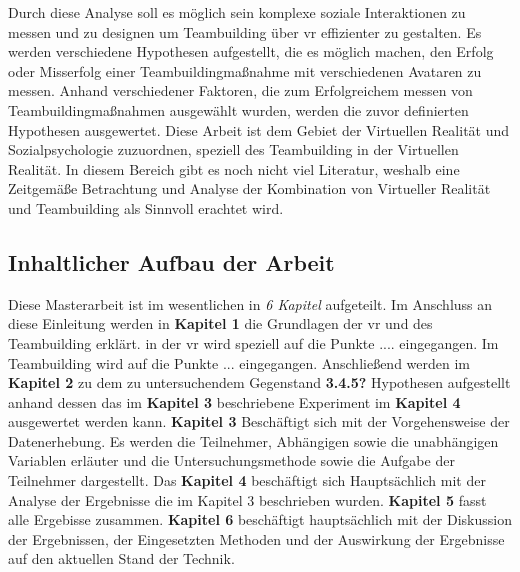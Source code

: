 \documentclass[a4paper,11pt]{article}%
\renewcommand{\\}{\vspace*{0.5\baselineskip} \newline}
\begin{document}
{	Durch diese Analyse soll es möglich sein komplexe soziale Interaktionen zu messen und zu designen um Teambuilding über \ac{vr} effizienter zu gestalten.\\
	Es werden verschiedene Hypothesen aufgestellt, die es möglich machen, den Erfolg oder Misserfolg einer Teambuildingmaßnahme mit verschiedenen Avataren zu messen.\\
	Anhand verschiedener Faktoren, die zum Erfolgreichem messen von Teambuildingmaßnahmen ausgewählt wurden, werden die zuvor definierten Hypothesen ausgewertet.\\
	Diese Arbeit ist dem Gebiet der Virtuellen Realität und Sozialpsychologie zuzuordnen, speziell des Teambuilding in der Virtuellen Realität.
	In diesem Bereich gibt es noch nicht viel Literatur, weshalb eine Zeitgemäße Betrachtung und Analyse der Kombination von Virtueller Realität und Teambuilding als Sinnvoll erachtet wird.\\



		\subsection{Inhaltlicher Aufbau der Arbeit}
	Diese Masterarbeit ist im wesentlichen in \textit{6 Kapitel} aufgeteilt.
	Im Anschluss an diese Einleitung werden in \textbf{Kapitel 1} die Grundlagen der \ac{vr} und des Teambuilding erklärt. in der \ac{vr} wird speziell auf die Punkte .... eingegangen.\\
	Im Teambuilding wird auf die Punkte ... eingegangen.\\
	Anschließend werden im \textbf{Kapitel 2} zu dem zu untersuchendem Gegenstand \textbf{3.4.5?} Hypothesen aufgestellt anhand dessen das im \textbf{Kapitel 3} beschriebene Experiment im \textbf{Kapitel 4} ausgewertet werden kann.\\
	\textbf{Kapitel 3} Beschäftigt sich mit der Vorgehensweise der Datenerhebung.
	Es werden die Teilnehmer, Abhängigen sowie die unabhängigen Variablen erläuter und die Untersuchungsmethode sowie die Aufgabe der Teilnehmer dargestellt.\\
	Das \textbf{Kapitel 4} beschäftigt sich Hauptsächlich mit der Analyse der Ergebnisse die im Kapitel 3 beschrieben wurden.\\
	\textbf{Kapitel 5} fasst alle Ergebisse zusammen.\\
	\textbf{Kapitel 6} beschäftigt hauptsächlich mit der Diskussion der Ergebnissen, der Eingesetzten Methoden und der Auswirkung der Ergebnisse auf den aktuellen Stand der Technik.\\
	
}
\end{document}

